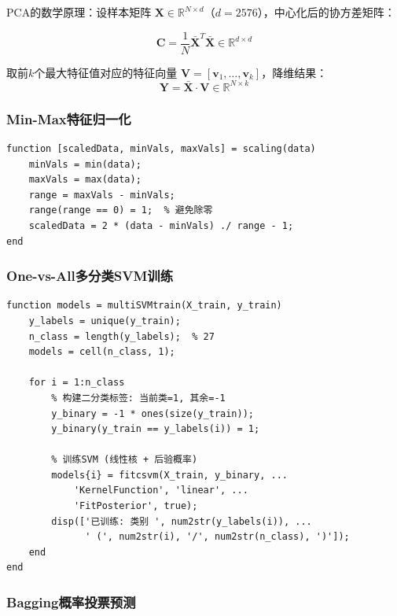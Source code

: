 \documentclass[12pt,a4paper]{ctexart}
\begin{document}
PCA的数学原理：设样本矩阵 $\mathbf{X} \in \mathbb{R}^{N \times d}$（$d=2576$），中心化后的协方差矩阵：

\begin{equation}
    \mathbf{C} = \frac{1}{N} \bar{\mathbf{X}}^T \bar{\mathbf{X}} \in \mathbb{R}^{d \times d}
\end{equation}

取前$k$个最大特征值对应的特征向量 $\mathbf{V} = [\mathbf{v}_1, \ldots, \mathbf{v}_k]$，降维结果：
\begin{equation}
    \mathbf{Y} = \bar{\mathbf{X}} \cdot \mathbf{V} \in \mathbb{R}^{N \times k}
\end{equation}

\subsubsection{Min-Max特征归一化}

\begin{lstlisting}[style=matlabstyle, caption={scaling.m -- Min-Max归一化至[-1,1]}]
function [scaledData, minVals, maxVals] = scaling(data)
    minVals = min(data);
    maxVals = max(data);
    range = maxVals - minVals;
    range(range == 0) = 1;  % 避免除零
    scaledData = 2 * (data - minVals) ./ range - 1;
end
\end{lstlisting}

\subsubsection{One-vs-All多分类SVM训练}

\begin{lstlisting}[style=matlabstyle, caption={multiSVMtrain.m -- 27个二分类SVM训练}]
function models = multiSVMtrain(X_train, y_train)
    y_labels = unique(y_train);
    n_class = length(y_labels);  % 27
    models = cell(n_class, 1);

    for i = 1:n_class
        % 构建二分类标签: 当前类=1, 其余=-1
        y_binary = -1 * ones(size(y_train));
        y_binary(y_train == y_labels(i)) = 1;

        % 训练SVM (线性核 + 后验概率)
        models{i} = fitcsvm(X_train, y_binary, ...
            'KernelFunction', 'linear', ...
            'FitPosterior', true);
        disp(['已训练: 类别 ', num2str(y_labels(i)), ...
              ' (', num2str(i), '/', num2str(n_class), ')']);
    end
end
\end{lstlisting}

\subsubsection{Bagging概率投票预测}
\end{document}
